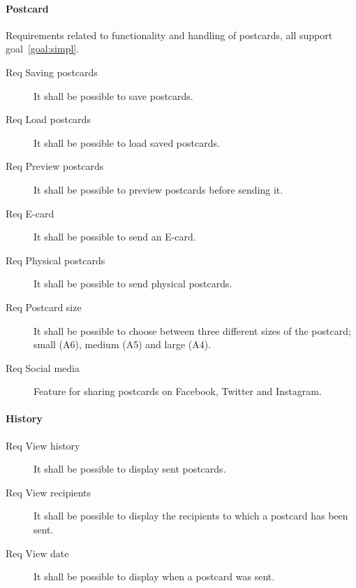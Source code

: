 \documentclass[10pt,a4paper]{article}
\begin{document}
\paragraph{Postcard}
Requirements related to functionality and handling of postcards, all support goal~\ref{goal:simpl}.


\begin{description}
	\item [Req \thesubsubsection {} Saving postcards] It shall be possible to save postcards.

	\item [Req \thesubsubsection {} Load postcards] It shall be possible to load saved postcards.
	
	
	\item [Req \thesubsubsection {} Preview postcards] It shall be possible to preview postcards before sending it.
	
	
	\item [Req \thesubsubsection {} E-card] It shall be possible to send an E-card.
	
	\item [Req \thesubsubsection {} Physical postcards] It shall be possible to send physical postcards.
	
	
	\item [Req \thesubsubsection {} Postcard size] It shall be possible to choose between three different sizes of the postcard; small (A6), medium (A5) and large (A4).
	

	
	\item [Req \thesubsubsection {} Social media] Feature for sharing postcards on Facebook, Twitter and Instagram.
\end{description}

\paragraph{History}
\begin{description}
\item [Req \thesubsubsection {} View history] It shall be possible to display sent postcards.

\item [Req \thesubsubsection {} View recipients] It shall be possible to display the recipients to which a postcard has been sent.

\item [Req \thesubsubsection {} View date] It shall be possible to display when a postcard was sent. 


\end{description}
\end{document}
